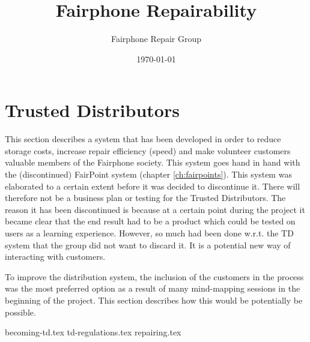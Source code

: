 \documentclass[final,a4paper]{report} %
\author{Fairphone Repair Group}
\title{Fairphone Repairability}
\date{\today}
\begin{document}
	\chapter{Trusted Distributors}\label{ch:trusted-distributors}
	This section describes a system that has been developed in order to reduce storage costs, increase repair efficiency (speed) and make volunteer customers valuable members of the Fairphone society. This system goes hand in hand with the (discontinued) FairPoint system (chapter \ref{ch:fairpoints}). This system was elaborated to a certain extent before it was decided to discontinue it. There will therefore not be a business plan or testing for the Trusted Distributors. The reason it has been discontinued is because at a certain point during the project it became clear that the end result had to be a product which could be tested on users as a learning experience. However, so much had been done w.r.t. the TD system that the group did not want to discard it. It is a potential new way of interacting with customers.
	
	To improve the distribution system, the inclusion of the customers in the process was the most preferred option as a result of many mind-mapping sessions in the beginning of the project. This section describes how this would be potentially be possible.
	
	{becoming-td.tex}
	{td-regulations.tex}
	{repairing.tex}
\end{document}
